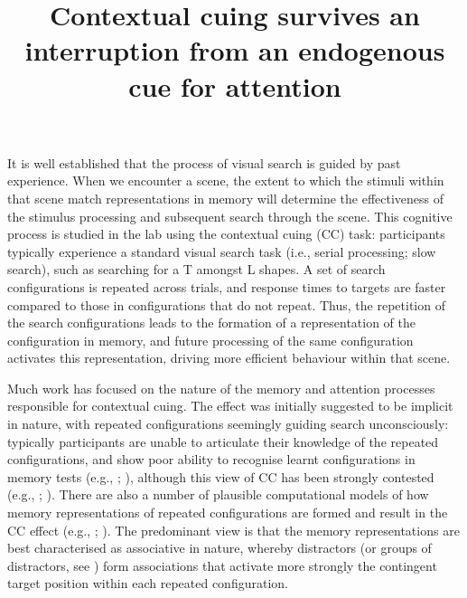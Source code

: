 \documentclass[
  man,
  floatsintext,
  longtable,
  nolmodern,
  notxfonts,
  notimes,
  colorlinks=true,linkcolor=blue,citecolor=blue,urlcolor=blue]{apa7}
\title{Contextual cuing survives an interruption from an endogenous cue
for attention}
\begin{document}
\maketitle


\setcounter{secnumdepth}{-\maxdimen} %

\setlength\LTleft{0pt}




It is well established that the process of visual search is guided by
past experience. When we encounter a scene, the extent to which the
stimuli within that scene match representations in memory will determine
the effectiveness of the stimulus processing and subsequent search
through the scene. This cognitive process is studied in the lab using
the contextual cuing (CC) task: participants typically experience a
standard visual search task (i.e., serial processing; slow search), such
as searching for a T amongst L shapes. A set of search configurations is
repeated across trials, and response times to targets are faster
compared to those in configurations that do not repeat. Thus, the
repetition of the search configurations leads to the formation of a
representation of the configuration in memory, and future processing of
the same configuration activates this representation, driving more
efficient behaviour within that scene.

Much work has focused on the nature of the memory and attention
processes responsible for contextual cuing. The effect was initially
suggested to be implicit in nature, with repeated configurations
seemingly guiding search unconsciously: typically participants are
unable to articulate their knowledge of the repeated configurations, and
show poor ability to recognise learnt configurations in memory tests
(e.g., ;
), although this
view of CC has been strongly contested (e.g.,
;
). There are also a
number of plausible computational models of how memory representations
of repeated configurations are formed and result in the CC effect (e.g.,
;
). The predominant view is
that the memory representations are best characterised as associative in
nature, whereby distractors (or groups of distractors, see
) form associations that
activate more strongly the contingent target position within each
repeated configuration.
\end{document}
